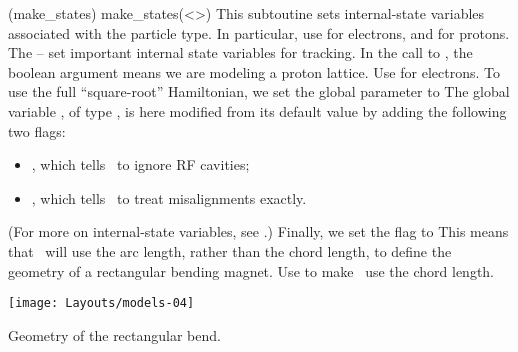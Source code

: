 %
\glossary[ptccmds](make\_states)%
  {make\_states(<\textit{}>)}%
  {This subtoutine sets internal-state variables associated
   with the particle type.
   In particular, use  for electrons,
   and  for protons.}
%
The -- set important
internal state variables for tracking. In the call to
, the boolean argument  means we are
modeling a proton lattice. Use  for electrons.%
To use the full ``square-root'' Hamiltonian, we set the global
parameter  to  The global variable
, of type , is here modified
from its default value by adding the following two flags:
\begin{itemize}
  \item {}, which tells \PTC\ to ignore RF cavities;
  \item {}, which tells \PTC\ to treat misalignments exactly.
\end{itemize}
(For more on internal-state variables, see .)
Finally, we set the flag  to  This
means that \PTC\ will use the arc length, rather than the chord
length, to define the geometry of a rectangular bending magnet.
Use  to make \PTC\ use the chord length.

\begin{MarginFigure}\forcerectofloat
  \texttt{[image: Layouts/models-04]}
  \caption{Geometry of the rectangular bend.}
  \label{fig:rect.bend}
\end{MarginFigure}


